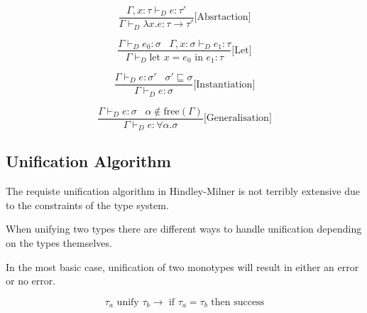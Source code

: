 \documentclass{l4proj}
\begin{document}
\begin{equation} \label{eq:HM-Abs}
   \frac{\Gamma, x : \tau \vdash_D e:\tau'}{\Gamma \vdash_D \lambda x.e:\tau \rightarrow \tau'}\text{[Absrtaction]}
\end{equation}

\begin{equation} \label{eq:HM-Let}
    \frac{\Gamma\vdash_D e_0:\sigma \;\;\; \Gamma ,x:\sigma \vdash_D e_1 :\tau}{\Gamma \vdash_D \text{let }x = e_0\text{ in } e_1 : \tau}\text{[Let]}
\end{equation}

\begin{equation} \label{eq:HM-Inst}
   \frac{\Gamma \vdash_D e:\sigma ' \;\;\; \sigma ' \sqsubseteq \sigma}{\Gamma \vdash_D e:\sigma}\text{[Instantiation]}
\end{equation}

\begin{equation} \label{eq:HM-Gen}
   \frac{\Gamma \vdash_D e:\sigma \;\;\; \alpha \notin \text{free}(\Gamma)}{\Gamma \vdash_D e: \forall \alpha . \sigma}\text{[Generalisation]}
\end{equation}
    
\newpage
\subsection{Unification Algorithm}

The requiste unification algorithm in Hindley-Milner is not terribly extensive due to the constraints of the type system.

When unifying two types there are different ways to handle unification depending on the types themselves.

In the most basic case, unification of two monotypes will result in either an error or no error.

\[\tau_a \text{ unify } \tau_b \rightarrow \text{ if } \tau_a = \tau_b \text{ then success}\]

\end{document}
